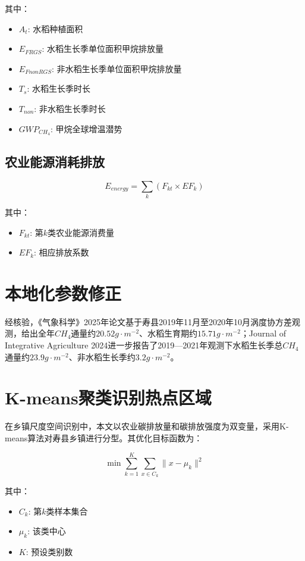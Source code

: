 \documentclass{article}
\begin{document}
其中：
\begin{itemize}
\item $A_t$: 水稻种植面积
\item $E_{FRGS}$: 水稻生长季单位面积甲烷排放量
\item $E_{FnonRGS}$: 非水稻生长季单位面积甲烷排放量
\item $T_s$: 水稻生长季时长
\item $T_{non}$: 非水稻生长季时长
\item $GWP_{CH_4}$: 甲烷全球增温潜势
\end{itemize}

\subsection{农业能源消耗排放}

\begin{equation}
E_{energy} = \sum_{k} (F_{kt} \times EF_k)
\end{equation}

其中：
\begin{itemize}
\item $F_{kt}$: 第$k$类农业能源消费量
\item $EF_k$: 相应排放系数
\end{itemize}

\section{本地化参数修正}

经核验，《气象科学》2025年论文基于寿县2019年11月至2020年10月涡度协方差观测，给出全年$CH_4$通量约$20.52 g \cdot m^{-2}$、水稻生育期约$15.71 g \cdot m^{-2}$；Journal of Integrative Agriculture 2024进一步报告了2019—2021年观测下水稻生长季总$CH_4$通量约$23.9 g \cdot m^{-2}$、非水稻生长季约$3.2 g \cdot m^{-2}$。

\section{K-means聚类识别热点区域}

在乡镇尺度空间识别中，本文以农业碳排放量和碳排放强度为双变量，采用K-means算法对寿县乡镇进行分型。其优化目标函数为：

\begin{equation}
\min \sum_{k=1}^{K} \sum_{x \in C_k} \| x - \mu_k \|^2
\end{equation}

其中：
\begin{itemize}
\item $C_k$: 第$k$类样本集合
\item $\mu_k$: 该类中心
\item $K$: 预设类别数
\end{itemize}
\end{document}
